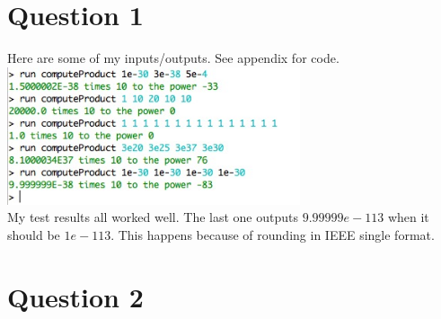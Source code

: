 \documentclass[12pt]{article}
\begin{document}


\section {Question 1}
Here are some of my inputs/outputs. See appendix for code.\\
\includegraphics[width=3.4in]{q1}
\\
My test results all worked well. The last one outputs $9.99999e-113$ when it should be $1e-113$. This happens because of rounding in IEEE single format. 


\section{Question 2}
\end{document}
